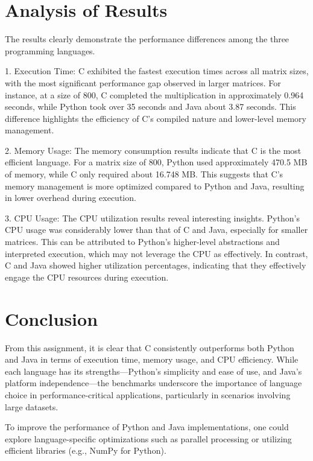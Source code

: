 \documentclass{article}
\begin{document}
\section{Analysis of Results}

The results clearly demonstrate the performance differences among the three programming languages.

1. Execution Time: C exhibited the fastest execution times across all matrix sizes, with the most significant performance gap observed in larger matrices. For instance, at a size of 800, C completed the multiplication in approximately 0.964 seconds, while Python took over 35 seconds and Java about 3.87 seconds. This difference highlights the efficiency of C's compiled nature and lower-level memory management.

2. Memory Usage: The memory consumption results indicate that C is the most efficient language. For a matrix size of 800, Python used approximately 470.5 MB of memory, while C only required about 16.748 MB. This suggests that C's memory management is more optimized compared to Python and Java, resulting in lower overhead during execution.

3. CPU Usage: The CPU utilization results reveal interesting insights. Python's CPU usage was considerably lower than that of C and Java, especially for smaller matrices. This can be attributed to Python's higher-level abstractions and interpreted execution, which may not leverage the CPU as effectively. In contrast, C and Java showed higher utilization percentages, indicating that they effectively engage the CPU resources during execution.

\section{Conclusion}

From this assignment, it is clear that C consistently outperforms both Python and Java in terms of execution time, memory usage, and CPU efficiency. While each language has its strengths—Python's simplicity and ease of use, and Java's platform independence—the benchmarks underscore the importance of language choice in performance-critical applications, particularly in scenarios involving large datasets.

To improve the performance of Python and Java implementations, one could explore language-specific optimizations such as parallel processing or utilizing efficient libraries (e.g., NumPy for Python).
\end{document}
